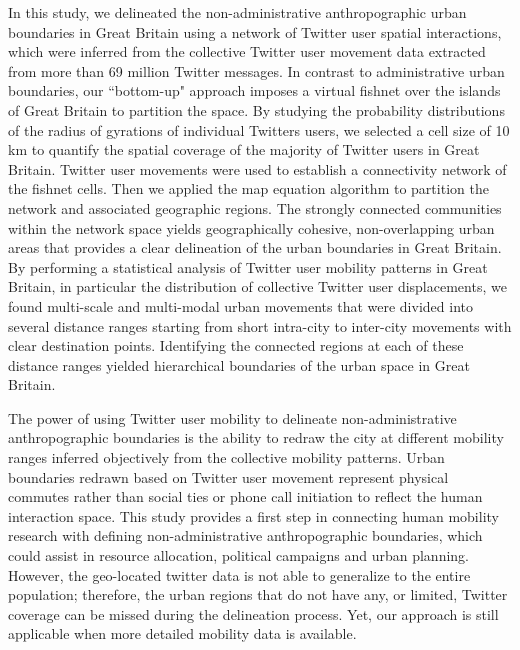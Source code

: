 \documentclass[]{tGIS2e}
\begin{document}
{In this study, we delineated the non-administrative anthropographic urban boundaries in Great Britain using a network of Twitter user spatial interactions, which were inferred from the collective Twitter user movement data extracted from more than 69 million Twitter messages.
In contrast to administrative urban boundaries, our ``bottom-up" approach imposes a virtual fishnet over the islands of Great Britain to partition the space.
By studying the probability distributions of the radius of gyrations of individual Twitters users, we selected a cell size of 10 km to quantify the spatial coverage of the majority of Twitter users in Great Britain. 
Twitter user movements were used to establish a connectivity network of the fishnet cells.
Then we applied the map equation algorithm to partition the network and associated geographic regions.
The strongly connected communities within the network space yields geographically cohesive, non-overlapping urban areas that provides a clear delineation of the urban boundaries in Great Britain.
By performing a statistical analysis of Twitter user mobility patterns in Great Britain, in particular the distribution of collective Twitter user displacements, we found multi-scale and multi-modal urban movements that were divided into several distance ranges starting from short intra-city to inter-city movements with clear destination points.
Identifying the connected regions at each of these distance ranges yielded hierarchical boundaries of  the urban space in Great Britain.

The power of using Twitter user mobility to delineate non-administrative anthropographic boundaries is the ability to redraw the city at different mobility ranges inferred objectively from the collective mobility patterns. 
Urban boundaries redrawn based on Twitter user movement represent physical commutes rather than social ties or phone call initiation to reflect the human interaction space.
This study provides a first step in connecting human mobility research with defining non-administrative anthropographic boundaries, which could assist in resource allocation, political campaigns and urban planning.
However, the geo-located twitter data is not able to generalize to the entire population; therefore, the urban regions that do not have any, or limited, Twitter coverage can be missed during the delineation process.
Yet, our approach is still applicable when more detailed mobility data is available. 



}
\end{document}

